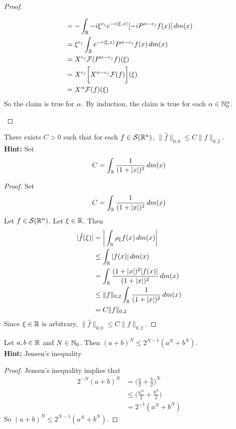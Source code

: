 \documentclass{book}
\begin{document}
\begin{proof}
\begin{enumerate}
\begin{align*}
				&= - \int_{\mathbb{R}} -i \xi^{e_j} e^{-i \langle \xi , x \rangle} [-iP^{\alpha-e_j}f(x)] \, d m(x) \\
				&= \xi^{e_j} \int_{\mathbb{R}}   e^{-i \langle \xi , x \rangle} P^{\alpha-e_j}f(x) \, d m(x) \\
				&= X^{e_j} \mathcal{F}(P^{\alpha-e_j}f)(\xi) \\
				& = X^{e_j} \bigg[ X^{\alpha-e_j}\mathcal{F}(f) \bigg](\xi) \\
				&= X^{\alpha} \mathcal{F}(f)(\xi) \\
			\end{align*}
			So the claim is true for $\alpha$. By induction, the claim is true for each $\alpha \in \mathbb{N}_0^n$.
		\end{enumerate}
	\end{proof}

	\begin{ex}
		There exists $C >0$ such that for each $f \in \mathcal{S}(\mathbb{R}^n)$, $\|\hat{f}\|_{0,0} \leq C \|f\|_{0, 2}$.\\
		\textbf{Hint:} Set $$C = \int_{\mathbb{R}} \frac{1}{(1+|x|)^2} \, d m(x)$$
	\end{ex}
	
	\begin{proof}
		Set 
		$$C = \int_{\mathbb{R}} \frac{1}{(1+|x|)^2} \, d m(x)$$
		Let $f \in \mathcal{S}(\mathbb{R}^n)$. Let $\xi \in \mathbb{R}$. Then 
		\begin{align*}
			|\hat{f}(\xi)| 
			& = \bigg| \int_{\mathbb{R}} \rho_{\xi} f(x) \, d m(x) \bigg| \\
			& \leq  \int_{\mathbb{R}} | f(x)| \, d m(x) \\
			& =  \int_{\mathbb{R}} \frac{(1+|x|)^2|f(x)|}{(1+|x|)^2} \, d m(x) \\
			& \leq \|f\|_{0, 2} \int_{\mathbb{R}} \frac{1}{(1+|x|)^2} \, d m(x) \\
			& = C\|f\|_{0, 2}
		\end{align*}
		Since $\xi \in \mathbb{R}$ is arbitrary, $\|\hat{f}\|_{0,0} \leq C\|f\|_{0, 2}$.
	\end{proof}

	\begin{ex}
		Let $a, b \in \mathbb{R}$ and $N \in \mathbb{N}_0$. Then $(a + b)^N \leq 2^{N-1} (a^N + b^N)$. \\
		\textbf{Hint:} Jensen's inequality
	\end{ex}
	
	\begin{proof}
		Jensen's inequality implies that 
		\begin{align*}
			2^{-N}(a + b)^N 
			& = \bigg(\frac{a}{2} + \frac{b}{2} \bigg)^N \\
			& \leq \bigg(\frac{a^N}{2} + \frac{b^N}{2} \bigg) \\
			& = 2^{-1}(a^N + b^N)
		\end{align*}
	So $(a + b)^N \leq 2^{N-1} (a^N + b^N)$.
	\end{proof}
\end{document}
